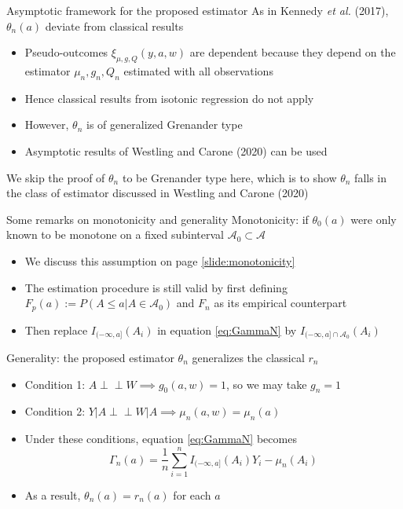 \documentclass{beamer}
\newcommand{\sn}{\sum_{i=1}^n}
\newcommand{\f}[2]{\frac{#1}{#2}}
\begin{document}
\begin{frame}{Asymptotic framework for the proposed estimator}
  As in Kennedy \textit{et al.} (2017), $\theta_n(a)$ deviate from classical results \\
  \begin{itemize}
    \item Pseudo-outcomes $\xi_{\mu,g,Q}(y,a,w)$ are dependent because they depend on the estimator $\mu_n, g_n, Q_n$ estimated with all observations
    \item Hence classical results from isotonic regression do not apply
    \item However, $\theta_n$ is of generalized Grenander type
    \item Asymptotic results of Westling and Carone (2020) can be used
  \end{itemize}
  We skip the proof of $\theta_n$ to be Grenander type here, which is to show $\theta_n$ falls in the class of estimator discussed in Westling and Carone (2020)
\end{frame}

\begin{frame}{Some remarks on monotonicity and generality} \label{slide:generality}
  Monotonicity: if $\theta_0(a)$ were only known to be monotone on a fixed subinterval $\mathcal{A}_0 \subset \mathcal{A}$
  \begin{itemize}
    \item We discuss this assumption on page \ref{slide:monotonicity}
    \item The estimation procedure is still valid by first defining $F_p(a):=P(A \le a| A \in \mathcal{A}_0)$ and $F_n$ as its empirical counterpart
    \item Then replace $I_{(-\infty,a]}(A_i)$ in equation \ref{eq:GammaN} by $I_{(-\infty,a] \cap \mathcal{A}_0}(A_i)$
  \end{itemize}
  Generality: the proposed estimator $\theta_n$ generalizes the classical $r_n$
  \begin{itemize}
    \item Condition 1: $A \perp \!\!\! \perp W \implies g_0(a,w) = 1$, so we may take $g_n=1$
    \item Condition 2: $Y|A \perp \!\!\! \perp W|A \implies \mu_n(a,w)=\mu_n(a)$
    \item Under these conditions, equation \ref{eq:GammaN} becomes
    $$\Gamma_n(a) = \f{1}{n} \sn I_{(-\infty,a]}(A_i) Y_i -\mu_n(A_i)$$
    \item As a result, $\theta_n(a) = r_n(a)$ for each $a$
  \end{itemize}
\end{frame}
\end{document}
